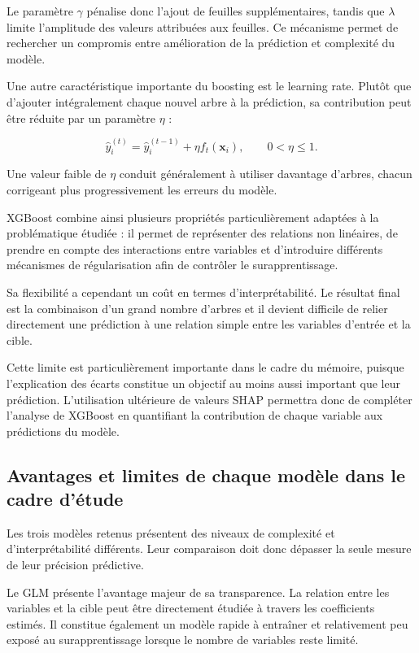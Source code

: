 Le paramètre $\gamma$ pénalise donc l'ajout de feuilles supplémentaires, tandis que $\lambda$ limite l'amplitude des valeurs attribuées aux feuilles. Ce mécanisme permet de rechercher un compromis entre amélioration de la prédiction et complexité du modèle.

Une autre caractéristique importante du boosting est le learning rate. Plutôt que d'ajouter intégralement chaque nouvel arbre à la prédiction, sa contribution peut être réduite par un paramètre $\eta$ :

\begin{equation}
    \widehat{y}_i^{(t)}
    =
    \widehat{y}_i^{(t-1)}
    +
    \eta f_t(\mathbf{x}_i),
    \qquad
    0 < \eta \leq 1.
\end{equation}

Une valeur faible de $\eta$ conduit généralement à utiliser davantage d'arbres, chacun corrigeant plus progressivement les erreurs du modèle.

XGBoost combine ainsi plusieurs propriétés particulièrement adaptées à la problématique étudiée : il permet de représenter des relations non linéaires, de prendre en compte des interactions entre variables et d'introduire différents mécanismes de régularisation afin de contrôler le surapprentissage.

Sa flexibilité a cependant un coût en termes d'interprétabilité. Le résultat final est la combinaison d'un grand nombre d'arbres et il devient difficile de relier directement une prédiction à une relation simple entre les variables d'entrée et la cible.

Cette limite est particulièrement importante dans le cadre du mémoire, puisque l'explication des écarts constitue un objectif au moins aussi important que leur prédiction. L'utilisation ultérieure de valeurs SHAP permettra donc de compléter l'analyse de XGBoost en quantifiant la contribution de chaque variable aux prédictions du modèle.


\subsection{Avantages et limites de chaque modèle dans le cadre d'étude}

Les trois modèles retenus présentent des niveaux de complexité et d'interprétabilité différents. Leur comparaison doit donc dépasser la seule mesure de leur précision prédictive.

Le GLM présente l'avantage majeur de sa transparence. La relation entre les variables et la cible peut être directement étudiée à travers les coefficients estimés. Il constitue également un modèle rapide à entraîner et relativement peu exposé au surapprentissage lorsque le nombre de variables reste limité.


